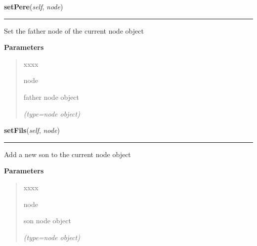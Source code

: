     \vspace{0.5ex}

\hspace{.8\funcindent}\begin{boxedminipage}{\funcwidth}

    \raggedright \textbf{setPere}(\textit{self}, \textit{node})

    \vspace{-1.5ex}

    \rule{\textwidth}{0.5\fboxrule}
\setlength{\parskip}{2ex}
    Set the father node of the current node object

\setlength{\parskip}{1ex}
      \textbf{Parameters}
      \vspace{-1ex}

      \begin{quote}
        \begin{Ventry}{xxxx}

          \item[node]

          father node object

            {\it (type=node object)}

        \end{Ventry}

      \end{quote}

    \end{boxedminipage}

    \label{script-phyloFixedVar:node:setFils}

    \vspace{0.5ex}

\hspace{.8\funcindent}\begin{boxedminipage}{\funcwidth}

    \raggedright \textbf{setFils}(\textit{self}, \textit{node})

    \vspace{-1.5ex}

    \rule{\textwidth}{0.5\fboxrule}
\setlength{\parskip}{2ex}
    Add a new son to the current node object

\setlength{\parskip}{1ex}
      \textbf{Parameters}
      \vspace{-1ex}

      \begin{quote}
        \begin{Ventry}{xxxx}

          \item[node]

          son node object

            {\it (type=node object)}

        \end{Ventry}

      \end{quote}

    \end{boxedminipage}

